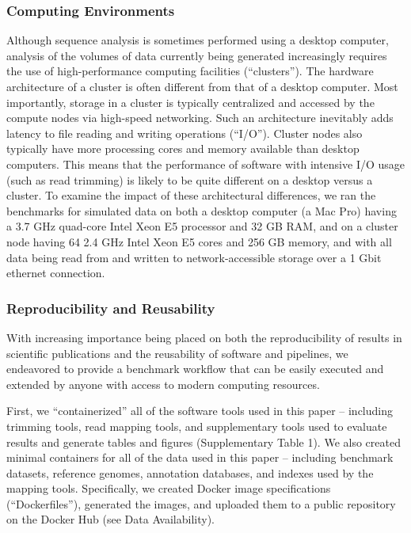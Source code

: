 \documentclass[fleqn,10pt,lineno]{wlpeerj} %
\begin{document}
\subsubsection{Computing Environments}

Although sequence analysis is sometimes performed using a desktop computer, analysis of the volumes of data currently being generated increasingly requires the use of high-performance computing facilities (``clusters''). The hardware architecture of a cluster is often different from that of a desktop computer. Most importantly, storage in a cluster is typically centralized and accessed by the compute nodes via high-speed networking. Such an architecture inevitably adds latency to file reading and writing operations (``I/O''). Cluster nodes also typically have more processing cores and memory available than desktop computers. This means that the performance of software with intensive I/O usage (such as read trimming) is likely to be quite different on a desktop versus a cluster. To examine the impact of these architectural differences, we ran the benchmarks for simulated data on both a desktop computer (a Mac Pro) having a 3.7 GHz quad-core Intel Xeon E5 processor and 32 GB RAM, and on a cluster node having 64 2.4 GHz Intel Xeon E5 cores and 256 GB memory, and with all data being read from and written to network-accessible storage over a 1 Gbit ethernet connection.

\subsubsection{Reproducibility and Reusability}

With increasing importance being placed on both the reproducibility of results in scientific publications and the reusability of software and pipelines, we endeavored to provide a benchmark workflow that can be easily executed and extended by anyone with access to modern computing resources. 

First, we ``containerized'' all of the software tools used in this paper -- including trimming tools, read mapping tools, and supplementary tools used to evaluate results and generate tables and figures (Supplementary Table 1).  We also created minimal containers for all of the data used in this paper -- including benchmark datasets, reference genomes, annotation databases, and indexes used by the mapping tools. Specifically, we created Docker \citep{Boettiger2015Docker} image specifications (``Dockerfiles''), generated the images, and uploaded them to a public repository on the Docker Hub (see Data Availability).
\end{document}
